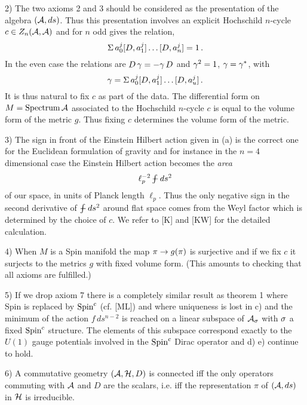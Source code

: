 \smallskip

\item{2)} The two axioms 2 and 3 should be considered as
the presentation of the algebra $({\cal A} ,ds)$. Thus this
presentation involves an explicit Hochschild $n$-cycle
$c\in Z_n ({\cal A} ,{\cal A})$ and for $n$ odd gives the relation,
$$
\Sigma \, a_0^j [D,a_1^j] \ldots [D,a_n^j] =1 \, .
$$
In the even case the relations are $D \, \gamma = -\gamma \, D$
and $\gamma^2 =1$, $\gamma = \gamma^*$, with
$$
\gamma = \Sigma \, a_0^j [D,a_1^j] \ldots [D,a_u^j] \, .
$$
It is thus natural to fix $c$ as part of the data. The
differential form on $M= \hbox{Spectrum} \, {\cal A}$
associated to the Hochschild $n$-cycle $c$ is equal to the
volume form of the metric $g$. Thus fixing $c$ determines
the volume form of the metric.

\smallskip

\item{3)} The sign in front of the Einstein Hilbert
action given in (a) is the correct one for the Euclidean
formulation of gravity and for instance in the $n = 4$
dimensional case the Einstein Hilbert action becomes the
{\it area} 
$$
\ell_p^{-2} \, {\textstyle \int \!\!\!\!\! -} \, ds^2
$$ 
of our space, in units of Planck length $\ell_p$. Thus the
only negative sign in the second derivative of $\int \!\!\!\!\! - \,
ds^2$ around flat space comes from the Weyl factor which
is determined by the choice of $c$. We refer to [K] and
[KW] for the detailed calculation.

\smallskip

\item{4)} When $M$ is a Spin manifold the map $\pi \rightarrow
g(\pi)$ is surjective and if we fix $c$ it surjects to
the metrics $g$ with fixed volume form. (This amounts to
checking that all axioms are fulfilled.)

\smallskip

\item{5)} If we drop axiom 7 there is a completely
similar result as theorem 1 where Spin is replaced by
$\hbox{Spin}^c$ (cf. [ML]) and where uniqueness is lost in
c) and the minimum of the action $f \, ds^{n-2}$ is
reached on a linear subspace of ${\cal A}_{\sigma}$ with $\sigma$ a
fixed $\hbox{Spin}^c$ structure. The elements of this
subspace correspond exactly to the $U(1)$ gauge potentials
involved in the $\hbox{Spin}^c$ Dirac operator and d) e)
continue to hold.

\smallskip

\item{6)} A commutative geometry $({\cal A} ,{\cal H} ,D)$ is
connected iff the only operators commuting with ${\cal A}$ and
$D$ are the scalars, i.e. iff the representation $\pi$ of
$({\cal A} ,ds)$ in ${\cal H}$ is irreducible.

